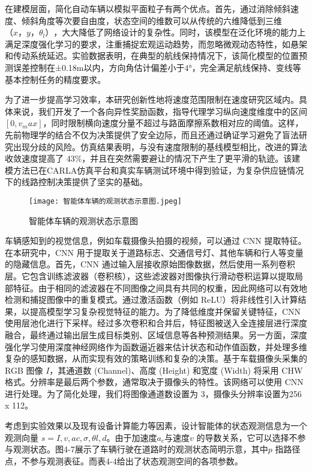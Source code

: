 在建模层面，简化自动车辆以模拟平面粒子有两个优点。首先，通过消除倾斜速度、倾斜角度等次要自由度，状态空间的维数可以从传统的六维降低到三维\(（x，y，θ_l）\)，大大降低了网络设计的复杂性。同时，该模型在泛化环境的能力上满足深度强化学习的要求，注重捕捉宏观运动趋势，而忽略微观动态特性，如悬架和传动系统延迟。实验数据表明，在典型的航线保持情况下，该简化模型的位置预测误差控制在±0.18m以内，方向角估计偏差小于\(4°\)，完全满足航线保持、变线等基本控制任务的精度要求。

为了进一步提高学习效率，本研究创新性地将速度范围限制在速度研究区域内。具体来说，我们开发了一个各向异性奖励函数，指导代理学习纵向速度维度中的区间 \([0, v_max]\)，同时限制横向速度分量不超过与路面摩擦系数相对应的阈值。这样，先前物理学的结合不仅为决策提供了安全边际，而且还通过确证学习避免了盲法研究出现分歧的风险。仿真结果表明，与没有速度限制的基线模型相比，改进的算法收敛速度提高了 43\%，并且在突然需要避让的情况下产生了更平滑的轨迹。该建模方法已在CARLA仿真平台和真实车辆测试环境中得到验证，为复杂供应链情况下的线路控制决策提供了坚实的基础。

\begin{figure}[hbt]
	\centering
	\texttt{[image: 智能体车辆的观测状态示意图.jpeg]}
	\caption{智能体车辆的观测状态示意图}
	\label{f.example}
\end{figure}

车辆感知到的视觉信息，例如车载摄像头拍摄的视频，可以通过 CNN 提取特征。在本研究中，CNN 用于提取关于道路标志、交通信号灯、其他车辆和行人等变量的隐藏信息。首先，CNN 通过输入层接收原始图像数据，然后使用一系列卷积层。它包含训练滤波器（卷积核），这些滤波器对图像执行滑动卷积运算以提取局部特征。由于相同的滤波器在不同图像之间具有共同的权重，因此网络可以有效地检测和捕捉图像中的重复模式。通过激活函数（例如 ReLU）将非线性引入计算结果，以提高模型学习复杂视觉特征的能力。为了降低维度并保留关键特征，CNN 使用层池化进行下采样。经过多次卷积和合并后，特征图被送入全连接层进行深度融合，最终通过输出层生成目标类别、区域信息等各种预测结果。另一方面，深度强化学习使用深度神经网络作为函数逼近器来估计状态和动作值函数，并处理多维复杂的感知数据，从而实现有效的策略训练和复杂的决策。基于车载摄像头采集的 RGB 图像 \(𝐼\)，其通道数 (Channel)、高度 (Height) 和宽度 (Width) 将采用 CHW 格式。分辨率是最后两个参数，通常取决于摄像头的特性。该网络可以使用 CNN 进行处理。为了简化处理，我们将图像通道数设置为 3，摄像头分辨率设置为256 x 112。

考虑到实验效果以及现有设备计算能力等因素，设计智能体的状态观测信息为一个观测向量 \(s = {𝐼, 𝑣, 𝑎𝑐, 𝜎, 𝜃𝑙, 𝑑}\)。由于加速度\(𝑎_𝑐\)与速度\(𝑣\) 的导数关系，它可以选择不参与观测状态。图4-7展示了车辆行驶在道路时的观测状态简明示意，其中\(𝑝\) 指路径点，不参与观测表征。而表4-4给出了状态观测空间的各项参数。


